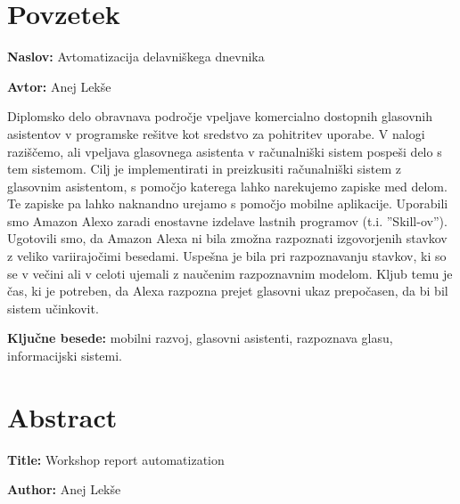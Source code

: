 \documentclass[a4paper, 12pt]{book}
\newcommand{\ttitle}{Avtomatizacija delavniškega dnevnika}
\newcommand{\ttitleEn}{Workshop report automatization}
\newcommand{\tauthor}{Anej Lekše}
\newcommand{\tkeywords}{mobilni razvoj, glasovni asistenti, razpoznava glasu, informacijski sistemi}
\newcommand{\clearemptydoublepage}{\newpage{\pagestyle{empty}\cleardoublepage}}
\begin{document}
\chapter*{Povzetek}

\noindent\textbf{Naslov:} \ttitle
\bigskip

\noindent\textbf{Avtor:} \tauthor
\bigskip


\noindent Diplomsko delo obravnava področje vpeljave komercialno dostopnih glasovnih asistentov v programske rešitve kot sredstvo za pohitritev uporabe.
V nalogi raziščemo, ali vpeljava glasovnega asistenta v računalniški sistem pospeši delo s tem sistemom. 
Cilj je implementirati in preizkusiti računalniški sistem z glasovnim asistentom, s pomočjo katerega lahko narekujemo zapiske med delom. 
Te zapiske pa lahko naknandno urejamo s pomočjo mobilne aplikacije.
Uporabili smo Amazon Alexo zaradi enostavne izdelave lastnih programov (t.i. ''Skill-ov'').
Ugotovili smo, da Amazon Alexa ni bila zmožna razpoznati izgovorjenih stavkov z veliko variirajočimi besedami.
Uspešna je bila pri razpoznavanju stavkov, ki so se v večini ali v celoti ujemali z naučenim razpoznavnim modelom.
Kljub temu je čas, ki je potreben, da Alexa razpozna prejet glasovni ukaz prepočasen, da bi bil sistem učinkovit.
\bigskip

\noindent\textbf{Ključne besede:} \tkeywords.
\clearemptydoublepage

\chapter*{Abstract}

\noindent\textbf{Title:} \ttitleEn
\bigskip

\noindent\textbf{Author:} \tauthor
\bigskip
\end{document}
